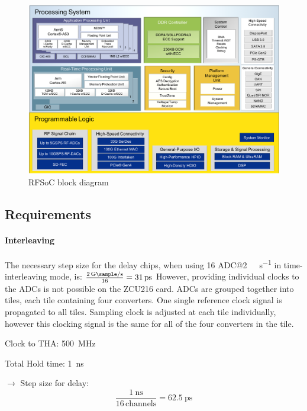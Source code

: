 \begin{figure}[H]
	\centering
	\includegraphics[width = \textwidth]{chap/03-work/img/rfsoc_blockdiagram}
	\caption{RFSoC block diagram}
	\label{fig:rfsoc}
\end{figure}

\subsection{Requirements}
\paragraph{Interleaving}
The necessary step size for the delay chips, when using 16 ADC@\SI{2}{\giga \sample \per \second} in time-interleaving mode, is: $\frac{\SI{2}{\giga \sample \per \second}}{16} = \SI{31}{\pico \second}$
However, providing individual clocks to the ADCs is not possible on the ZCU216 card. ADCs are grouped together into tiles, each tile containing four converters. One single reference clock signal is propagated to all tiles. Sampling clock is adjusted at each tile individually, however this clocking signal is the same for all of the four converters in the tile.

Clock to THA: \SI{500}{\mega \hertz}

Total Hold time: \SI{1}{\nano \second}

$\rightarrow$ Step size for delay:
\begin{equation}
	\frac{\SI{1}{\nano \second}}{16 \, \text{channels}} = \SI{62.5}{\pico \second}
\end{equation}


